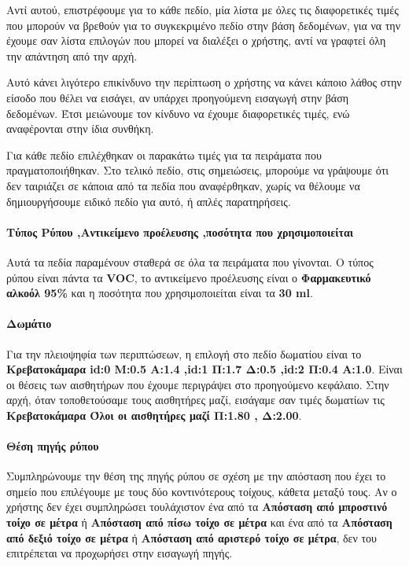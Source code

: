 Αντί αυτού, επιστρέφουμε για το κάθε πεδίο, μία λίστα με όλες τις διαφορετικές τιμές που
μπορούν να βρεθούν για το συγκεκριμένο πεδίο
στην βάση δεδομένων, για να την έχουμε σαν λίστα επιλογών που μπορεί να διαλέξει ο
χρήστης, αντί να γραφτεί όλη την απάντηση από την αρχή.

Αυτό κάνει λιγότερο επικίνδυνο την περίπτωση ο χρήστης να κάνει κάποιο λάθος στην
είσοδο που θέλει να εισάγει,
αν υπάρχει προηγούμενη εισαγωγή στην βάση δεδομένων.
Έτσι μειώνουμε τον κίνδυνο  να έχουμε διαφορετικές τιμές, ενώ αναφέρονται στην ίδια
συνθήκη.

Για κάθε πεδίο επιλέχθηκαν οι παρακάτω τιμές για τα πειράματα που πραγματοποιήθηκαν.
Στο τελικό πεδίο, στις σημειώσεις, μπορούμε να γράψουμε ότι δεν ταιριάζει σε κάποια από
τα πεδία που αναφέρθηκαν,
χωρίς να θέλουμε να δημιουργήσουμε ειδικό πεδίο για αυτό, ή απλές παρατηρήσεις.

\paragraph{Τύπος Ρύπου ,Αντικείμενο προέλευσης ,ποσότητα που χρησιμοποιείται}

Αυτά τα πεδία παραμένουν σταθερά σε όλα τα πειράματα που γίνονται.
Ο τύπος ρύπου είναι πάντα τα \textbf{VOC},
το αντικείμενο προέλευσης είναι ο \textbf{Φαρμακευτικό αλκοόλ 95\%}
και η ποσότητα που χρησιμοποιείται είναι τα \textbf{30 ml}.

\paragraph{Δωμάτιο}

Για την πλειοψηφία των περιπτώσεων, η επιλογή στο πεδίο δωματίου είναι το
\textbf{Κρεβατοκάμαρα id:0 Μ:0.5 Α:1.4 ,id:1 Π:1.7 Δ:0.5 ,id:2 Π:0.4 Α:1.0}.
Είναι οι θέσεις των αισθητήρων που έχουμε περιγράψει στο προηγούμενο κεφάλαιο.
Στην αρχή, όταν τοποθετούσαμε τους αισθητήρες μαζί, εισάγαμε σαν τιμές δωματίων τις
\textbf{Κρεβατοκάμαρα Όλοι οι αισθητήρες μαζί Π:1.80 , Δ:2.00}.

\paragraph{Θέση πηγής ρύπου}

Συμπληρώνουμε την θέση της πηγής ρύπου σε σχέση με την απόσταση που έχει το σημείο
που επιλέγουμε με τους δύο κοντινότερους τοίχους,
κάθετα μεταξύ τους.
Αν ο χρήστης δεν έχει συμπληρώσει τουλάχιστον ένα από τα \textbf{Απόσταση από
μπροστινό τοίχο σε μέτρα} ή \textbf{Απόσταση από πίσω τοίχο σε μέτρα}
και ένα από τα \textbf{Απόσταση από δεξιό τοίχο σε μέτρα} ή \textbf{Απόσταση από
αριστερό τοίχο σε μέτρα},
δεν του επιτρέπεται να προχωρήσει στην εισαγωγή πηγής.

